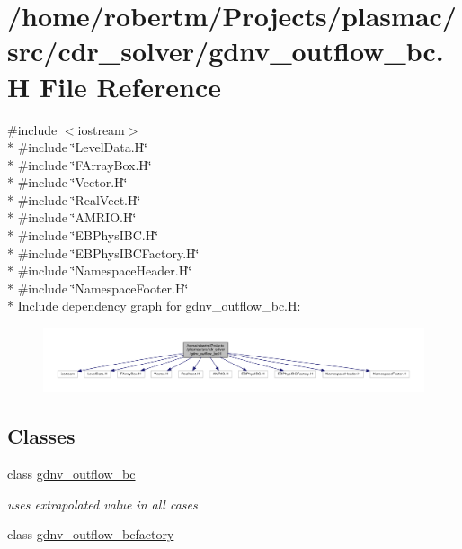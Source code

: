 \hypertarget{gdnv__outflow__bc_8H}{}\section{/home/robertm/\+Projects/plasmac/src/cdr\+\_\+solver/gdnv\+\_\+outflow\+\_\+bc.H File Reference}
\label{gdnv__outflow__bc_8H}
{\ttfamily \#include $<$iostream$>$}\\*
{\ttfamily \#include \char`\"{}Level\+Data.\+H\char`\"{}}\\*
{\ttfamily \#include \char`\"{}F\+Array\+Box.\+H\char`\"{}}\\*
{\ttfamily \#include \char`\"{}Vector.\+H\char`\"{}}\\*
{\ttfamily \#include \char`\"{}Real\+Vect.\+H\char`\"{}}\\*
{\ttfamily \#include \char`\"{}A\+M\+R\+I\+O.\+H\char`\"{}}\\*
{\ttfamily \#include \char`\"{}E\+B\+Phys\+I\+B\+C.\+H\char`\"{}}\\*
{\ttfamily \#include \char`\"{}E\+B\+Phys\+I\+B\+C\+Factory.\+H\char`\"{}}\\*
{\ttfamily \#include \char`\"{}Namespace\+Header.\+H\char`\"{}}\\*
{\ttfamily \#include \char`\"{}Namespace\+Footer.\+H\char`\"{}}\\*
Include dependency graph for gdnv\+\_\+outflow\+\_\+bc.\+H\+:\nopagebreak
\begin{figure}[H]
\begin{center}
\leavevmode
\includegraphics[width=350pt]{gdnv__outflow__bc_8H__incl}
\end{center}
\end{figure}
\subsection*{Classes}
\begin{DoxyCompactItemize}
\item 
class \hyperlink{classgdnv__outflow__bc}{gdnv\+\_\+outflow\+\_\+bc}
\begin{DoxyCompactList}\small\item\em uses extrapolated value in all cases \end{DoxyCompactList}\item 
class \hyperlink{classgdnv__outflow__bcfactory}{gdnv\+\_\+outflow\+\_\+bcfactory}
\end{DoxyCompactItemize}

